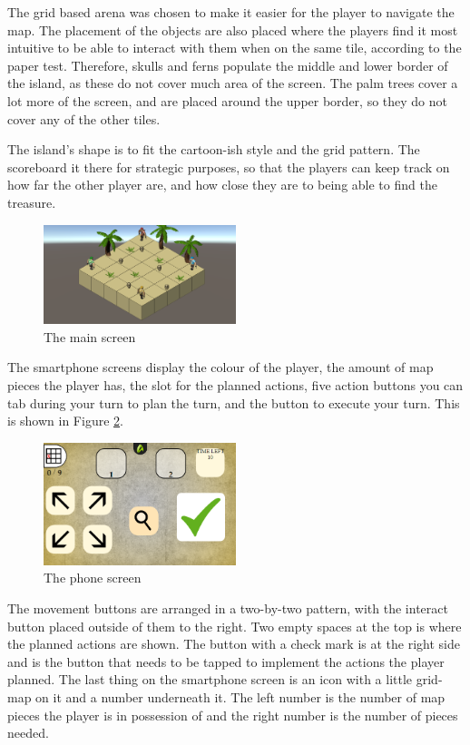 The grid based arena was chosen to make it easier for the player to navigate the map. The placement of the objects are also placed where the players find it most intuitive to be able to interact with them when on the same tile, according to the paper test. Therefore, skulls and ferns populate the middle and lower border of the island, as these do not cover much area of the screen. The palm trees cover a lot more of the screen, and are placed around the upper border, so they do not cover any of the other tiles.

The island's shape is to fit the cartoon-ish style and the grid pattern. The scoreboard it there for strategic purposes, so that the players can keep track on how far the other player are, and how close they are to being able to find the treasure. 

\begin{figure}
	\centering
	\includegraphics[width = 0.5\textwidth]{figures/MainScreen}
	\caption{The main screen}\label{fig:main_screen}
\end{figure}

The smartphone screens display the colour of the player, the amount of map pieces the player has, the slot for the planned actions, five action buttons you can tab during your turn to plan the turn, and the button to execute your turn. This is shown in Figure \ref{fig:phone_screen}.

\begin{figure}
	\centering
	\includegraphics[width =0.5\textwidth]{figures/PhoneScreen}
	\caption{The phone screen}\label{fig:phone_screen}
\end{figure}

The movement buttons are arranged in a two-by-two pattern, with the interact button placed outside of them to the right. Two empty spaces at the top is where the planned actions are shown. The button with a check mark is at the right side and is the button that needs to be tapped to implement the actions the player planned. The last thing on the smartphone screen is an icon with a little grid-map on it and a number underneath it. The left number is the number of map pieces the player is in possession of and the right number is the number of pieces needed. 


